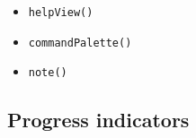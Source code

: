 \begin{itemize}
  \begin{itemize}
  \tightlist
  \item
    \texttt{h\allowbreak{}e\allowbreak{}l\allowbreak{}p\allowbreak{}V\allowbreak{}i\allowbreak{}e\allowbreak{}w\allowbreak{}(\allowbreak{})}
  \item
    \texttt{c\allowbreak{}o\allowbreak{}m\allowbreak{}m\allowbreak{}a\allowbreak{}n\allowbreak{}d\allowbreak{}P\allowbreak{}a\allowbreak{}l\allowbreak{}e\allowbreak{}t\allowbreak{}t\allowbreak{}e\allowbreak{}(\allowbreak{})}
  \item
    \texttt{n\allowbreak{}o\allowbreak{}t\allowbreak{}e\allowbreak{}(\allowbreak{})}
  \end{itemize}
\end{itemize}

\subsection{Progress indicators}\label{record-019-progress-indicators}

